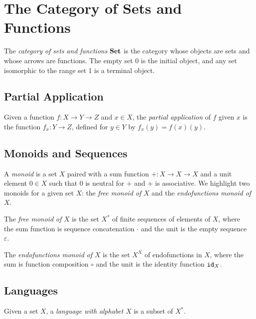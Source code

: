 \section{The Category of Sets and Functions}
The \emph{category of sets and functions} $\AsCategory{Set}$ is the category whose objects are sets and whose arrows are functions. The empty set $0$ is the initial object, and any set isomorphic to the range set 1 is a terminal object.


\subsection{Partial Application}
Given a function $f\colon X\rightarrow Y \rightarrow Z$ and $x\in X$, the \emph{partial application} of $f$ given $x$ is the function $f_x\colon Y \rightarrow Z$, defined for $y\in Y$ by $f_x(y)=f(x)(y)$.

\subsection{Monoids and Sequences} 
A \emph{monoid} is a set $X$ paired with a sum function $+\colon X\rightarrow X\rightarrow X$ and a unit element $0\in X$ such that $0$ is neutral for $+$ and $+$ is associative. We highlight two monoids for a given set $X$: the \emph{free monoid of $X$} and the \emph{endofunctions monoid of $X$}.

The \emph{free monoid of $X$} is the set $X^*$ of finite sequences of elements of $X$, where the sum function is sequence concatenation $\cdot$ and the unit is the empty sequence $\varepsilon$. 

The \emph{endofunctions monoid of $X$} is the set $X^X$ of endofunctions in $X$, where the sum is function composition $\circ$ and the unit is the identity function ${\texttt{id}}_X$.

\subsection{Languages}
Given a set $X$, a \emph{language with alphabet $X$} is a subset of $X^*$. 

